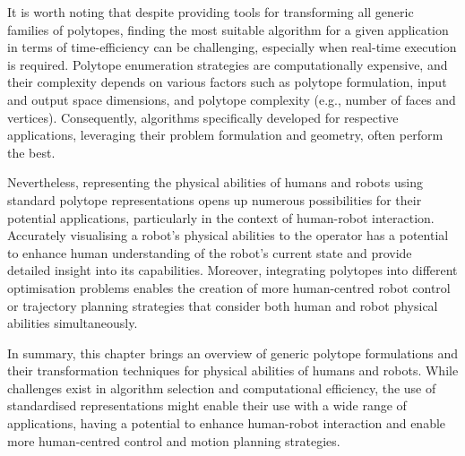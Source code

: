 It is worth noting that despite providing tools for transforming all generic families of polytopes, finding the most suitable algorithm for a given application in terms of time-efficiency can be challenging, especially when real-time execution is required. Polytope enumeration strategies are computationally expensive, and their complexity depends on various factors such as polytope formulation, input and output space dimensions, and polytope complexity (e.g., number of faces and vertices). Consequently, algorithms specifically developed for respective applications, leveraging their problem formulation and geometry, often perform the best.

Nevertheless, representing the physical abilities of humans and robots using standard polytope representations opens up numerous possibilities for their potential applications, particularly in the context of human-robot interaction. Accurately visualising a robot's physical abilities to the operator has a potential to enhance human understanding of the robot's current state and provide detailed insight into its capabilities. Moreover, integrating polytopes into different optimisation problems enables the creation of more human-centred robot control or trajectory planning strategies that consider both human and robot physical abilities simultaneously.

In summary, this chapter brings an overview of generic polytope formulations and their transformation techniques for physical abilities of humans and robots. While challenges exist in algorithm selection and computational efficiency, the use of standardised representations might enable their use with a wide range of applications, having a potential to enhance human-robot interaction and enable more human-centred control and motion planning strategies.